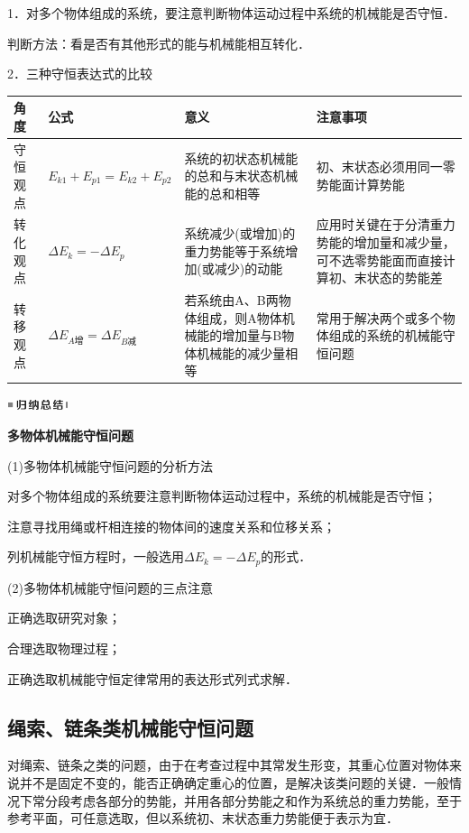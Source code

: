 1．对多个物体组成的系统，要注意判断物体运动过程中系统的机械能是否守恒．

判断方法：看是否有其他形式的能与机械能相互转化．

2．三种守恒表达式的比较

\begin{longtable}[]{@{}m{0.8cm}m{3.5cm}m{5cm}m{4cm}@{}}
\toprule
角度 & 公式 & 意义 & 注意事项\tabularnewline
\midrule
\endhead

守恒
观点
&
$E_{k1}+E_{p1}=E_{k2}+E_{p2}$
&
系统的初状态机械能的总和与末状态机械能的总和相等
&
初、末状态必须用同一零势能面计算势能
\tabularnewline

转化
观点
&
$\Delta E_k=-\Delta E_p$
&
系统减少(或增加)的重力势能等于系统增加(或减少)的动能
&
应用时关键在于分清重力势能的增加量和减少量，可不选零势能面而直接计算初、末状态的势能差
\tabularnewline

转移
观点
&
$\Delta E_{A\text{增}}=
\Delta E_{B\text{减}}$
&
若系统由A、B两物体组成，则A物体机械能的增加量与B物体机械能的减少量相等
&
常用于解决两个或多个物体组成的系统的机械能守恒问题\tabularnewline
\bottomrule
\end{longtable}

\begin{center}\includegraphics[width=0.70764in,height=0.12292in]{media/image13.png}

\textbf{多物体机械能守恒问题}
\end{center}


(1)多物体机械能守恒问题的分析方法

对多个物体组成的系统要注意判断物体运动过程中，系统的机械能是否守恒；

注意寻找用绳或杆相连接的物体间的速度关系和位移关系；

列机械能守恒方程时，一般选用$\Delta E_k=-\Delta E_p$的形式．

(2)多物体机械能守恒问题的三点注意

正确选取研究对象；

合理选取物理过程；

正确选取机械能守恒定律常用的表达形式列式求解．


\subsection{绳索、链条类机械能守恒问题}

对绳索、链条之类的问题，由于在考查过程中其常发生形变，其重心位置对物体来说并不是固定不变的，能否正确确定重心的位置，是解决该类问题的关键．一般情况下常分段考虑各部分的势能，并用各部分势能之和作为系统总的重力势能，至于参考平面，可任意选取，但以系统初、末状态重力势能便于表示为宜．



